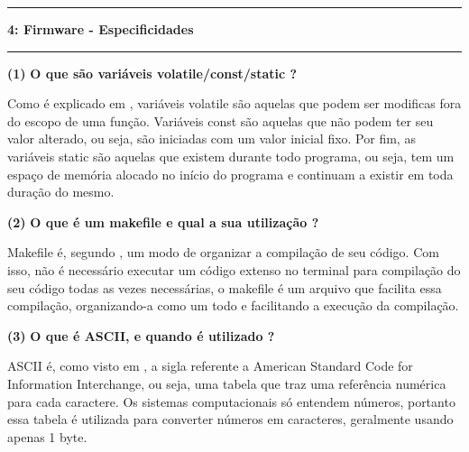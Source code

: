 \documentclass[11pt]{article}
\newcommand\question[2]{\vspace{.25in}\hrule\textbf{#1: #2}\vspace{.5em}\hrule\vspace{.10in}}
\renewcommand\part[1]{\vspace{.10in}\textbf{(#1)}}
\newcommand\volatile{\vspace{.10in}\textbf{O que são variáveis volatile/const/static ?}}
\newcommand\makefile{\vspace{.10in}\textbf{O que é um makefile e qual a sua utilização ?}}
\newcommand\ascii{\vspace{.10in}\textbf{O que é ASCII, e quando é utilizado ?}}
\begin{document}
\raggedright
\question{4}{Firmware - Especificidades}

\raggedright
\part{1}
\volatile

\RaggedRight
Como é explicado em \cite{variables}, variáveis volatile são aquelas que podem ser modificas fora do escopo de uma função. Variáveis const são aquelas que não podem ter seu valor alterado, ou seja, são iniciadas com um valor inicial fixo. Por fim, as variáveis static são aquelas que existem durante todo programa, ou seja, tem um espaço de memória alocado no início do programa e continuam a existir em toda duração do mesmo.

\raggedright
\part{2}
\makefile

\RaggedRight
Makefile é, segundo \cite{makefile}, um modo de organizar a compilação de seu código. Com isso, não é necessário executar um código extenso no terminal para compilação do seu código todas as vezes necessárias, o makefile é um arquivo que facilita essa compilação, organizando-a como um todo e facilitando a execução da compilação.

\raggedright
\part{3}
\ascii

\RaggedRight
ASCII é, como visto em \cite{ascii}, a sigla referente a American Standard Code for Information Interchange, ou seja, uma tabela que traz uma referência numérica para cada caractere. Os sistemas computacionais só entendem números, portanto essa tabela é utilizada para converter números em caracteres, geralmente usando apenas 1 byte.

{}

\end{document}
